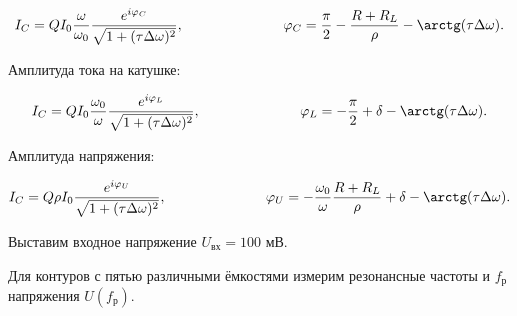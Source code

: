 \documentclass[a4paper,12pt]{article} %
\begin{document}
\begin{equation*}
	I_C = QI_0\frac{\omega}{\omega_0}\frac{e^{i\varphi_C}}{\sqrt{1 + (\tau\Delta\omega)^2}}, \hspace{25mm} \varphi_C = \frac{\pi}{2} - \frac{R+R_L}{\rho} - \arctg(\tau\Delta\omega).
\end{equation*}

Амплитуда тока на катушке:

\begin{equation*}
	I_C = QI_0\frac{\omega_0}{\omega}\frac{e^{i\varphi_L}}{\sqrt{1 + (\tau\Delta\omega)^2}}, \hspace{25mm} \varphi_L = -\frac{\pi}{2} +\delta - \arctg(\tau\Delta\omega).
\end{equation*}

Амплитуда напряжения:

\begin{equation*}
	I_C = Q\rho I_0\frac{e^{i\varphi_U}}{\sqrt{1 + (\tau\Delta\omega)^2}}, \hspace{25mm} \varphi_U = -\frac{\omega_0}{\omega}\frac{R+R_L}{\rho} + \delta - \arctg(\tau\Delta\omega).
\end{equation*}
		
\newpage

Выставим входное напряжение $U_{\text{вх}} = 100$ мВ.


Для контуров с пятью различными ёмкостями измерим резонансные частоты и $f_{\text{р}}$ напряжения $U(f_{\text{р}})$.
\end{document}
